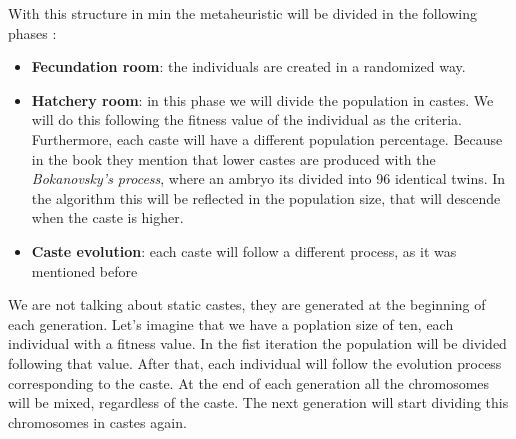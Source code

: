 With this structure in min the metaheuristic will be divided in the following phases :

\begin{itemize}
    \item \textbf{Fecundation room}: the individuals are created in a randomized way.
    \item \textbf{Hatchery room}: in this phase we will divide the population in castes. We will do this following the fitness value
    of the individual as the criteria. Furthermore, each caste will have a different population percentage. Because in the book they
    mention that lower castes are produced with the \textit{Bokanovsky's process}, where an ambryo its divided into 96 identical twins.
    In the algorithm this will be reflected in the population size, that will descende when the caste is higher.
    \item \textbf{Caste evolution}: each caste will follow a different process, as it was mentioned before
\end{itemize}

We are not talking about static castes, they are generated at the beginning of each generation. Let's imagine that we have a poplation size of ten, 
each individual with a fitness value. In the fist iteration the population will be divided following that value. After that, each individual will 
follow the evolution process corresponding to the caste. At the end of each generation all the chromosomes will be mixed, regardless of the caste. The
next generation will start dividing this chromosomes in castes again. 
